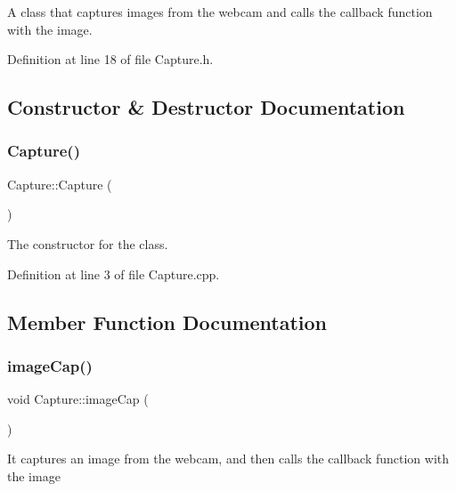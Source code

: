 A class that captures images from the webcam and calls the callback function with the image. 

Definition at line 18 of file Capture.\+h.



\subsection{Constructor \& Destructor Documentation}
\mbox{\label{class_gesture_detection_1_1_capture_a97036b5d271238bd4852da79a0091b57}} 
\subsubsection{\texorpdfstring{Capture()}{Capture()}}
{\footnotesize\ttfamily Capture\+::\+Capture (\begin{DoxyParamCaption}{ }\end{DoxyParamCaption})}

The constructor for the class. 

Definition at line 3 of file Capture.\+cpp.



\subsection{Member Function Documentation}
\mbox{\label{class_gesture_detection_1_1_capture_a010b666cb1482b235f8282867e8f1b97}} 
\subsubsection{\texorpdfstring{image\+Cap()}{imageCap()}}
{\footnotesize\ttfamily void Capture\+::image\+Cap (\begin{DoxyParamCaption}{ }\end{DoxyParamCaption})\hspace{0.3cm}{\ttfamily [private]}}

It captures an image from the webcam, and then calls the callback function with the image 

